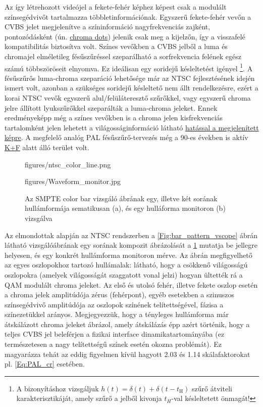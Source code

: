 Az így létrehozott videójel a fekete-fehér képhez képest csak a modulált színsegédvivőt tartalmazza többletinformációnak.
Egyszerű fekete-fehér vevőn a CVBS jelet megjelenítve a színinformáció nagyfrekvenciás zajként, pontozódásként (ún. \href{http://www.techmind.org/colrec/}{chroma dots}) jelenik csak meg a kijelzőn, így a visszafelé kompatibilitás biztosítva volt.
Színes vevőkben a CVBS jelből a luma és chromajel elméletileg fésűszűréssel szeparálható a sorfrekvencia felének egész számú többszöröseit elnyomva.
Ez ideálisan egy soridejű késleltetést igényel \footnote{A bizonyításhoz vizsgáljuk $h(t) = \delta(t) + \delta(t-t_{\mathrm{H}})$ szűrő átviteli karakterisztikáját, amely szűrő a jelből kivonja $t_H$-val késleltetett önmagát!}.
A fésűszűrős luma-chroma szeparáció lehetősége már az NTSC fejlesztésének idején ismert volt, azonban a szükséges soridejű késleltető nem állt rendelkezésre, ezért a korai NTSC vevők egyszerű alul/felüláteresztő szűrőkkel, vagy egyszerű chroma jelre állított lyukszűrőkkel szeparálták a luma-chroma jeleket.
Ennek eredményeképp még a színes vevőkben is a chroma jelen kisfrekvenciás tartalomként jelen lehetett a világosságinformáció látható \href{https://en.wikipedia.org/wiki/Dot_crawl}{hatással a megjelenített képre}.
A megfelelő analóg PAL fésűszűrő-tervezés még a 90-es években is aktív \href{https://www.renesas.com/in/en/www/doc/application-note/an9644.pdf}{K+F} alatt álló terület volt.

\begin{figure}[]
	\centering
	\begin{overpic}[width = 0.45\columnwidth ]{figures/ntsc_color_line.png}
	\end{overpic} \hfill
	\begin{overpic}[width = 0.48\columnwidth ]{figures/Waveform_monitor.jpg}
	\end{overpic} \hfill
	\caption{Az SMPTE color bar vizsgáló ábrának egy, illetve két sorának hullámformája sematikusan (a), és egy hulláforma monitoron (b) vizsgálva}
	\label{Fig:NTSC_line}
\end{figure}

Az elmondottak alapján az NTSC rendszerben a \ref{Fig:bar_pattern_vscope} ábrán látható vizsgálóábrának egy sorának kompozit ábrázolását a \ref{Fig:NTSC_line} mutatja be jellegre helyesen, és egy konkrét hullámforma monitoron mérve.
Az ábrán megfigyelhető az egyes oszlopokhoz tartozó hullámalak: látható, hogy a csökkenő világosságú oszlopokra (amelyek világosságát szaggatott vonal jelzi) hogyan ültették rá a QAM modulált chroma jeleket.
Az első és utolsó fehér, illetve fekete oszlop esetén a chroma jelek amplitúdója zérus (fehérpont), egyéb esetekben a szinuszos színsegédvivő amplitúdója az oszlopok színének telítettségével, fázisa a színezetükkel arányos.
Megjegyezzük, hogy a tényleges hullámforma már átskálázott chroma jeleket ábrázol, amely átskálázás épp azért történik, hogy a teljes CVBS jel beleférjen a fizikai interface dinamikatartományába (ez természetesen a nagy telítettségű színek esetén okozna problémát).
Ez magyarázza tehát az eddig figyelmen kívül hagyott 2.03 és 1.14 skálafaktorokat pl. \eqref{Eq:PAL_cr} esetében.



